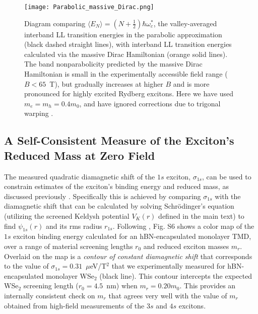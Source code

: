 \documentclass[aps,prl,twocolumn]{revtex4-1}
\begin{document}
\begin{figure}[h]
\center
\texttt{[image: Parabolic\_massive\_Dirac.png]}
\caption{Diagram comparing $\langle E_N \rangle = (N+\frac{1}{2})\hbar \omega_c^*$, the valley-averaged interband LL transition energies in the parabolic approximation (black dashed straight lines), with interband LL transition energies calculated via the massive Dirac Hamiltonian (orange solid lines). The band nonparabolicity predicted by the massive Dirac Hamiltonian is small in the experimentally accessible field range ($B<65$~T), but gradually increases at higher $B$ and is more pronounced for highly excited Rydberg excitons. Here we have used $m_e = m_h = 0.4 m_0$, and have ignored corrections due to trigonal warping \cite{Rose}.} \label{fig2}
\end{figure}

\subsection{A Self-Consistent Measure of the Exciton's Reduced Mass at Zero Field}

The measured quadratic diamagnetic shift of the $1s$ exciton, $\sigma_{1s}$, can be used to constrain estimates of the exciton's binding energy and reduced mass, as discussed previously \cite{Stier_Nano, Stier_NatComm}.  Specifically this is achieved by comparing $\sigma_{1s}$ with the diamagnetic shift that can be calculated by solving Schr\"{o}dinger's equation (utilizing the screened Keldysh potential $V_K(r)$ defined in the main text) to find $\psi_{1s}(r)$ and its rms radius $r_{1s}$. Following \cite{Stier_NatComm, Stier_Nano}, Fig. S6 shows a color map of the $1s$ exciton binding energy calculated for an hBN-encapsulated monolayer TMD, over a range of material screening lengths $r_0$ and reduced exciton masses $m_r$. Overlaid on the map is a \textit{contour of constant diamagnetic shift} that corresponds to the value of $\sigma_{1s} = 0.31$~$\mu$eV/T$^2$ that we experimentally measured for hBN-encapsulated monolayer WSe$_2$ (black line). This contour intercepts the expected WSe$_2$ screening length ($r_0 = 4.5$~nm) when $m_r=0.20 m_0$. This provides an internally consistent check on $m_r$ that agrees very well with the value of $m_r$ obtained from high-field measurements of the $3s$ and $4s$ excitons.  
\end{document}
